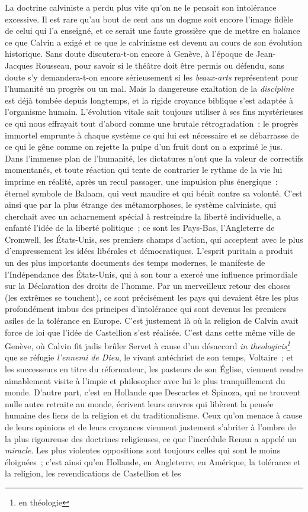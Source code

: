 \documentclass[french,twoside]{book} %
\newcommand\foreign[1]{\emph{#1}}
\begin{document}
La doctrine calviniste a perdu plus vite qu’on ne le pensait son intolérance excessive. Il est rare qu’au bout de cent ans un dogme soit encore l’image fidèle de celui qui l’a enseigné, et ce serait une faute grossière que de mettre en balance ce que Calvin a exigé et ce que le calvinisme est devenu au cours de son évolution historique. Sans doute discutera-t-on encore à Genève, à l’époque de Jean-Jacques Rousseau, pour savoir si le théâtre doit être permis ou défendu, sans doute s’y demandera-t-on encore sérieusement si les \emph{beaux-arts} représentent pour l’humanité un progrès ou un mal. Mais la dangereuse exaltation de la \emph{discipline} est déjà tombée depuis longtemps, et la rigide croyance biblique s’est adaptée à l’organisme humain. L’évolution vitale sait toujours utiliser à ses fins mystérieuses ce qui nous effrayait tout d’abord comme une brutale rétrogradation : le progrès immortel emprunte à chaque système ce qui lui est nécessaire et se débarrasse de ce qui le gêne comme on rejette la pulpe d’un fruit dont on a exprimé le jus. Dans l’immense plan de l’humanité, les dictatures n’ont que la valeur de correctifs momentanés, et toute réaction qui tente de contrarier le rythme de la vie lui imprime en réalité, après un recul passager, une impulsion plus énergique : éternel symbole de Balaam, qui veut maudire et qui bénit contre sa volonté. C’est ainsi que par la plus étrange des métamorphoses, le système calviniste, qui cherchait avec un acharnement spécial à restreindre la liberté individuelle, a enfanté l’idée de la liberté politique ; ce sont les Pays-Bas, l’Angleterre de Cromwell, les États-Unis, ses premiers champs d’action, qui acceptent avec le plus d’empressement les idées libérales et démocratiques. L’esprit puritain a produit un des plus importants documents des temps modernes, le manifeste de l’Indépendance des États-Unis, qui à son tour a exercé une influence primordiale sur la Déclaration des droits de l’homme. Par un merveilleux retour des choses (les extrêmes se touchent), ce sont précisément les pays qui devaient être les plus profondément imbus des principes d’intolérance qui sont devenus les premiers asiles de la tolérance en Europe. C’est justement là où la religion de Calvin avait force de loi que l’idée de Castellion s’est réalisée. C’est dans cette même ville de Genève, où Calvin fit jadis brûler Servet à cause d’un désaccord \foreign{in theologicis\footnote{en théologie}} que se réfugie \emph{l’ennemi de Dieu}, le vivant antéchrist de son temps, Voltaire ; et les successeurs en titre du réformateur, les pasteurs de son Église, viennent rendre aimablement visite à l’impie et philosopher avec lui le plus tranquillement du monde. D’autre part, c’est en Hollande que Descartes et Spinoza, qui ne trouvent nulle autre retraite au monde, écrivent leurs œuvres qui libèrent la pensée humaine des liens de la religion et du traditionalisme. Ceux qu’on menace à cause de leurs opinions et de leurs croyances viennent justement s’abriter à l’ombre de la plus rigoureuse des doctrines religieuses, ce que l’incrédule Renan a appelé un \emph{miracle}. Les plus violentes oppositions sont toujours celles qui sont le moins éloignées ; c’est ainsi qu’en Hollande, en Angleterre, en Amérique, la tolérance et la religion, les revendications de Castellion et les 
\end{document}
